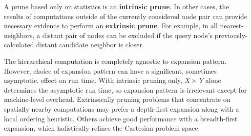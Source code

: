 \documentclass[twoside,leqno,twocolumn]{article}
\newcommand{\prefsplit}[2]{#1 \succ #2}
\newcommand{\summary}{\delta}
\newcommand{\gnp}{\psi}
\newcommand{\defterm}[1]{{\bf #1}}
\newcommand{\kdroot}[1]{#1^{\text{root}}}
\newcommand{\outstat}{\sigma}
\begin{document}
A prune based only on statistics is an \defterm{intrinsic prune}.
In other cases, the results of computations outside of the currently considered node pair can provide necessary evidence to perform an \defterm{extrinsic prune}.
For example, in all nearest-neighbors, a distant pair of nodes can be excluded if the query node's previously-calculated distant candidate neighbor is closer.



The hierarchical computation is completely agnostic to expansion pattern.
However, choice of expansion pattern can have a significant, sometimes asymptotic, effect on run time.
With intrinsic pruning only, $\prefsplit{X}{Y}$ alone determines the asymptotic run time, so expansion pattern is irrelevant except for machine-level overhead.
Extrinsically pruning problems that concentrate on spatially nearby computations may prefer a depth-first expansion along with a local ordering heuristic.
Others achieve good performance with a breadth-first expansion, which holistically refines the Cartesian problem space.
\end{document}
